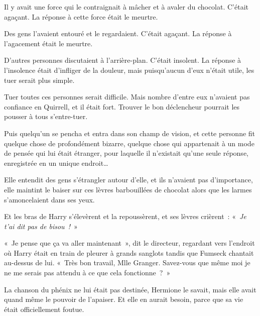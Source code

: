 \later

Il y avait une force qui le contraignait à mâcher et à avaler du chocolat. C'était agaçant. La réponse à cette force était le meurtre.

Des gens l'avaient entouré et le regardaient. C'était agaçant. La réponse à l'agacement était le meurtre.

D'autres personnes discutaient à l'arrière-plan. C'était insolent. La réponse à l'insolence était d'infliger de la douleur, mais puisqu'aucun d'eux n'était utile, les tuer serait plus simple.

Tuer toutes ces personnes serait difficile. Mais nombre d'entre eux n'avaient pas confiance en Quirrell, et il était fort. Trouver le bon déclencheur pourrait les pousser à tous s'entre-tuer.

Puis quelqu'un se pencha et entra dans son champ de vision, et cette personne fit quelque chose de profondément bizarre, quelque chose qui appartenait à un mode de pensée qui lui était étranger, pour laquelle il n'existait qu'une seule réponse, enregistrée en un unique endroit…

\later

Elle entendit des gens s'étrangler autour d'elle, et ils n'avaient pas d'importance, elle maintint le baiser sur ces lèvres barbouillées de chocolat alors que les larmes s'amoncelaient dans ses yeux.

Et les bras de Harry s'élevèrent et la repoussèrent, et ses lèvres crièrent~: «~\emph{Je t'ai dit pas de bisou~!}~»

\later

«~Je pense que ça va aller maintenant~», dit le directeur, regardant vers l'endroit où Harry était en train de pleurer à grands sanglots tandis que Fumseck chantait au-dessus de lui. «~Très bon travail, Mlle Granger. Savez-vous que même moi je ne me serais pas attendu à ce que cela fonctionne~?~»

La chanson du phénix ne lui était pas destinée, Hermione le savait, mais elle avait quand même le pouvoir de l'apaiser. Et elle en aurait besoin, parce que sa vie était officiellement foutue.
